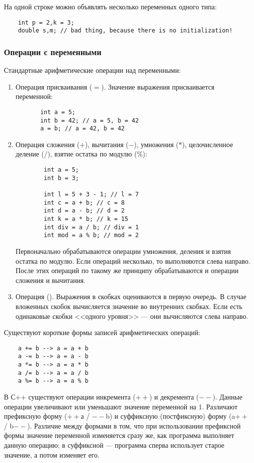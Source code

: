 На одной строке можно объявлять несколько переменных одного типа:
\begin{lstlisting}
    int p = 2,k = 3;
    double s,m; // bad thing, because there is no initialization!
\end{lstlisting}

\subsubsection{Операции с переменными}
Стандартные арифметические операции над переменными:
\begin{enumerate}
    \item Операция присваивания ($=$). Значение выражения присваивается переменной:
    \begin{lstlisting}
       int a = 5;
       int b = 42; // a = 5, b = 42
       a = b; // a = 42, b = 42
    \end{lstlisting}
    \item Операция сложения ($+$), вычитания ($-$), умножения ($*$), целочисленное деление ($/$), взятие остатка по модулю ($\%$):
    \begin{lstlisting}
        int a = 5;
        int b = 3;

        int l = 5 + 3 - 1; // l = 7
        int c = a + b; // c = 8
        int d = a - b; // d = 2
        int k = a * b; // k = 15
        int div = a / b; // div = 1
        int mod = a % b; // mod = 2
    \end{lstlisting}

    Первоначально обрабатываются операции умножения, деления и взятия остатка по модулю. Если операций несколько, то выполняются слева направо. После этих операций по такому же принципу обрабатываются и операции сложения и вычитания.

    \item Операция (). Выражения в скобках оцениваются в первую очередь. В случае вложенных скобок вычисляется значение во внутренних скобках. Если есть одинаковые скобки <<одного уровня>> --- они вычисляются слева направо.
\end{enumerate}

Существуют короткие формы записей арифметических операций:
\begin{lstlisting}
    a += b --> a = a + b
    a -= b --> a = a - b
    a *= b --> a = a * b
    a /= b --> a = a / b
    a %= b --> a = a % b
\end{lstlisting}

В С++ существуют операции инкремента ($++$) и декремента ($--$). Данные операции увеличивают или уменьшают значение переменной на 1. Различают префиксную форму ($++$а / $--$b) и суффиксную (постфиксную) форму (a$++$ / b$--$). Различие между формами в том, что при использовании префиксной формы значение переменной изменяется сразу же, как программа выполняет данную операцию; в суффиксной --- программа сперва использует старое значение, а потом изменяет его.

